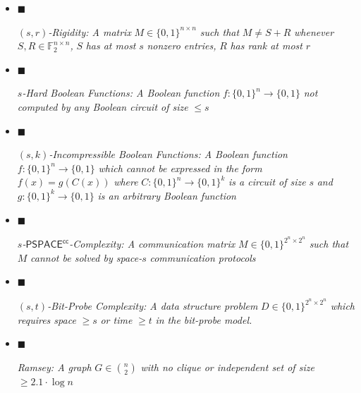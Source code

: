 \documentclass[10pt,a4paper]{article}
\begin{document}
\begin{itemize}


\item[] 
$\blacksquare$ 


$(s,r)$\emph{-Rigidity: A matrix }$M\in\{0,1\}^{n\times n}$\emph{ such that }$M\neq S+R$\emph{ whenever }$S,R\in\mathbb{F}_{2}^{n\times n}$\emph{, }$S$\emph{ has at most }$s$\emph{ nonzero entries, }$R$\emph{ has rank at most }$r$\emph{}\par





\item[] 
$\blacksquare$ 


$s$\emph{-Hard Boolean Functions: A Boolean function }$f:\{0,1\}^{n}\to\{0,1\}$\emph{ not computed by any Boolean circuit of size }$\leq s$\emph{}\par





\item[] 
$\blacksquare$ 


$(s,k)$\emph{-Incompressible Boolean Functions: A Boolean function }$f:\{0,1\}^{n}\to\{0,1\}$\emph{ which cannot be expressed in the form }$f(x)=g(C(x))$\emph{ where }$C:\{0,1\}^{n}\to\{0,1\}^{k}$\emph{ is a circuit of size }$s$\emph{ and }$g:\{0,1\}^{k}\to\{0,1\}$\emph{ is an arbitrary Boolean function}\par





\item[] 
$\blacksquare$ 


$s$\emph{-}${\mathsf{PSPACE}}^{{\mathsf{cc}}}$\emph{-Complexity: A communication matrix }$M\in\{0,1\}^{2^{n}\times 2^{n}}$\emph{ such that }$M$\emph{ cannot be solved by space-}$s$\emph{ communication protocols}\par





\item[] 
$\blacksquare$ 


$(s,t)$\emph{-Bit-Probe Complexity: A data structure problem }$D\in\{0,1\}^{2^{n}\times 2^{n}}$\emph{ which requires space }$\geq s$\emph{ or time }$\geq t$\emph{ in the bit-probe model.}\par





\item[] 
$\blacksquare$ 


\emph{Ramsey: A graph }$G\in\binom{n}{2}$\emph{ with no clique or independent set of size }$\geq 2.1\cdot\log n$\emph{}\par





\end{itemize}
\end{document}
